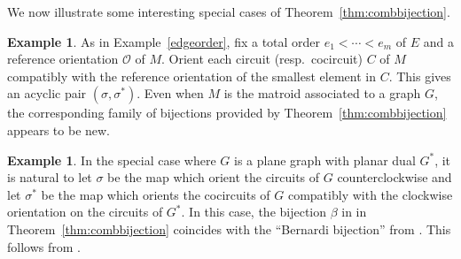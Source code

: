 \documentclass[12pt]{amsart}
\numberwithin{equation}{section}
\theoremstyle{definition}
\newtheorem{example}[theorem]{Example}
\begin{document}
We now illustrate some interesting special cases of Theorem~\ref{thm:combbijection}.

\begin{example}\label{edgeorderB}
As in Example~\ref{edgeorder},
fix a total order $e_1 < \cdots < e_m$ of $E$ and a reference orientation ${\mathcal O}$ of $M$.  Orient each circuit (resp.~cocircuit) $C$ of $M$ compatibly with the reference orientation of the smallest element in $C$.  This gives an acyclic pair $(\sigma,\sigma^*)$.  Even when $M$ is the matroid associated to a graph $G$, 
the corresponding family of bijections provided by Theorem~\ref{thm:combbijection} appears to be new.
\end{example}

\begin{example} \label{ex:planarbijectionB}
In the special case where $G$ is a plane graph with planar dual $G^*$, it is natural to let $\sigma$ be the map which orient the circuits of $G$ counterclockwise and let $\sigma^*$ be the map which orients the cocircuits of $G$ compatibly with the clockwise orientation on the circuits of $G^*$.  
In this case, the bijection $\beta$ in in Theorem~\ref{thm:combbijection} coincides with the ``Bernardi bijection'' from
\cite{bakeryao2016torsor}.  This follows from \cite[Theorem 15]{yuen2015geometric}.  
\end{example}
\end{document}
